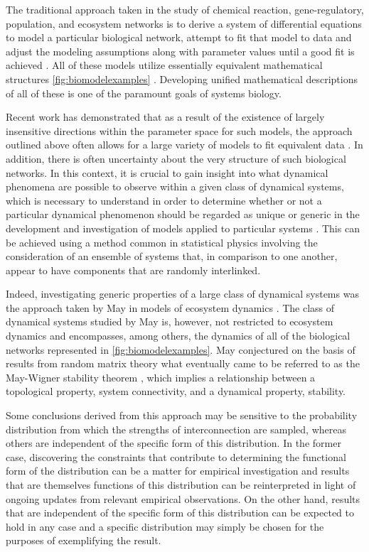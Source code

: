 The traditional approach taken in the study of chemical reaction, gene-regulatory, population, and ecosystem networks is to derive a system of differential equations to model a particular biological network, attempt to fit that model to data and adjust the modeling assumptions along with parameter values until a good fit is achieved \cite{Meyer2014}. All of these models utilize essentially equivalent mathematical structures \ref{fig:biomodelexamples} \cite{RossCr2003,Alon2006,Palsson2006,HamidBolouri2008,Palsson2011a,Voit2012,Sauro2012}. Developing unified mathematical descriptions of all of these is one of the paramount goals of systems biology.

Recent work has demonstrated that as a result of the existence of largely insensitive directions within the parameter space for such models, the approach outlined above often allows for a large variety of models to fit equivalent data \cite{Brown2003,Gutenkunst2007,Daniels2008a,Machta2013,Hines2014,Prabakaran2014,Tonsing2014}. In addition, there is often uncertainty about the very structure of such biological networks. In this context, it is crucial to gain insight into what dynamical phenomena are possible to observe within a given class of dynamical systems, which is necessary to understand in order to determine whether or not a particular dynamical phenomenon should be regarded as unique or generic in the development and investigation of models applied to particular systems \cite{Gunawardena2013,Gunawardena2014}. This can be achieved using a method common in statistical physics involving the consideration of an ensemble of systems that, in comparison to one another, appear to have components that are randomly interlinked.

Indeed, investigating generic properties of a large class of dynamical systems was the approach taken by May in models of ecosystem dynamics \cite{Gardner1970,May1972}. The class of dynamical systems studied by May is, however, not restricted to ecosystem dynamics and encompasses, among others, the dynamics of all of the biological networks represented in \ref{fig:biomodelexamples}. May conjectured on the basis of results from random matrix theory what eventually came to be referred to as the May-Wigner stability theorem \cite{Cohen1984,May1972a,Radius2014,Majumdar2014}, which implies a relationship between a topological property, system connectivity, and a dynamical property, stability.

Some conclusions derived from this approach may be sensitive to the probability distribution from which the strengths of interconnection are sampled, whereas others are independent of the specific form of this distribution. In the former case, discovering the constraints that contribute to determining the functional form of the distribution can be a matter for empirical investigation and results that are themselves functions of this distribution can be reinterpreted in light of ongoing updates from relevant empirical observations. On the other hand, results that are independent of the specific form of this distribution can be expected to hold in any case and a specific distribution may simply be chosen for the purposes of exemplifying the result.

